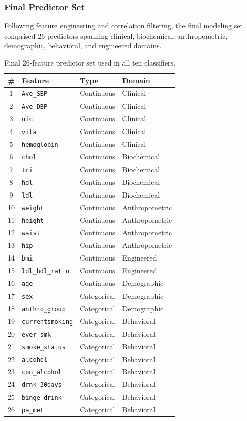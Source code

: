 \subsubsection{Final Predictor Set}

Following feature engineering and correlation filtering, the final modeling set comprised 26 predictors spanning clinical, biochemical, anthropometric, demographic, behavioral, and engineered domains.

\begin{table}[H]
\centering
\caption{Final 26-feature predictor set used in all ten classifiers.}
\label{tab:final_features}
\begin{tabular}{clll}
\hline
\textbf{\#} & \textbf{Feature} & \textbf{Type} & \textbf{Domain} \\
\hline
1 & \texttt{Ave\_SBP} & Continuous & Clinical \\
2 & \texttt{Ave\_DBP} & Continuous & Clinical \\
3 & \texttt{uic} & Continuous & Clinical \\
4 & \texttt{vita} & Continuous & Clinical \\
5 & \texttt{hemoglobin} & Continuous & Clinical \\
6 & \texttt{chol} & Continuous & Biochemical \\
7 & \texttt{tri} & Continuous & Biochemical \\
8 & \texttt{hdl} & Continuous & Biochemical \\
9 & \texttt{ldl} & Continuous & Biochemical \\
10 & \texttt{weight} & Continuous & Anthropometric \\
11 & \texttt{height} & Continuous & Anthropometric \\
12 & \texttt{waist} & Continuous & Anthropometric \\
13 & \texttt{hip} & Continuous & Anthropometric \\
14 & \texttt{bmi} & Continuous & Engineered \\
15 & \texttt{ldl\_hdl\_ratio} & Continuous & Engineered \\
16 & \texttt{age} & Continuous & Demographic \\
17 & \texttt{sex} & Categorical & Demographic \\
18 & \texttt{anthro\_group} & Categorical & Demographic \\
19 & \texttt{currentsmoking} & Categorical & Behavioral \\
20 & \texttt{ever\_smk} & Categorical & Behavioral \\
21 & \texttt{smoke\_status} & Categorical & Behavioral \\
22 & \texttt{alcohol} & Categorical & Behavioral \\
23 & \texttt{con\_alcohol} & Categorical & Behavioral \\
24 & \texttt{drnk\_30days} & Categorical & Behavioral \\
25 & \texttt{binge\_drink} & Categorical & Behavioral \\
26 & \texttt{pa\_met} & Categorical & Behavioral \\
\hline
\end{tabular}
\end{table}

